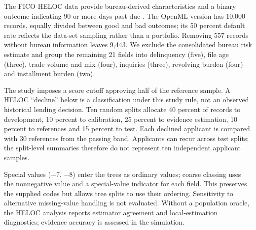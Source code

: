 The FICO HELOC data provide bureau-derived characteristics and a binary outcome indicating 90 or more days past due \citep{heloc}. The OpenML version has 10{,}000 records, equally divided between good and bad outcomes; its 50 percent default rate reflects the data-set sampling rather than a portfolio. Removing 557 records without bureau information leaves 9{,}443. We exclude the consolidated bureau risk estimate and group the remaining 21 fields into delinquency (five), file age (three), trade volume and mix (four), inquiries (three), revolving burden (four) and installment burden (two).

The study imposes a score cutoff approving half of the reference sample. A HELOC ``decline'' below is a classification under this study rule, not an observed historical lending decision. Ten random splits allocate 40 percent of records to development, 10 percent to calibration, 25 percent to evidence estimation, 10 percent to references and 15 percent to test. Each declined applicant is compared with 30 references from the passing band. Applicants can recur across test splits; the split-level summaries therefore do not represent ten independent applicant samples.

Special values ($-7$, $-8$) enter the trees as ordinary values; coarse classing uses the nonnegative value and a special-value indicator for each field. This preserves the supplied codes but allows tree splits to use their ordering. Sensitivity to alternative missing-value handling is not evaluated. Without a population oracle, the HELOC analysis reports estimator agreement and local-estimation diagnostics; evidence accuracy is assessed in the simulation.